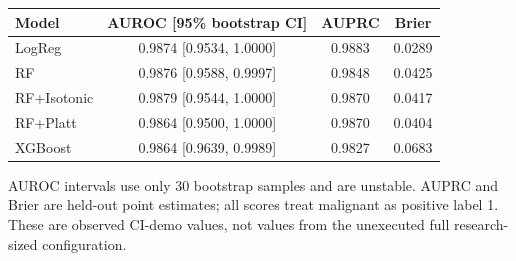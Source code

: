 \begin{center}
\small
\begin{tabular}{l c c c}
\toprule
Model & AUROC [95\% bootstrap CI] & AUPRC & Brier \\
\midrule
LogReg & 0.9874 [0.9534, 1.0000] & 0.9883 & 0.0289 \\
RF & 0.9876 [0.9588, 0.9997] & 0.9848 & 0.0425 \\
RF+Isotonic & 0.9879 [0.9544, 1.0000] & 0.9870 & 0.0417 \\
RF+Platt & 0.9864 [0.9500, 1.0000] & 0.9870 & 0.0404 \\
XGBoost & 0.9864 [0.9639, 0.9989] & 0.9827 & 0.0683 \\
\bottomrule
\end{tabular}
\end{center}
\noindent\small AUROC intervals use only 30 bootstrap samples and are unstable.
AUPRC and Brier are held-out point estimates; all scores treat malignant
as positive label 1. These are observed CI-demo values, not values from
the unexecuted full research-sized configuration.\normalsize
